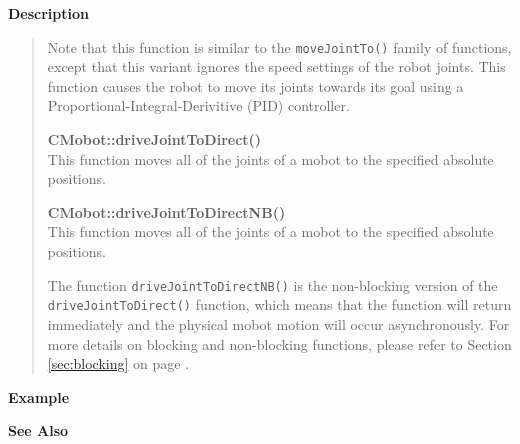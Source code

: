 {\bf Description}\\
\vspace{-12pt}
\begin{quote}
Note that this function is similar to the \texttt{moveJointTo()} family of functions, except
that this variant ignores the speed settings of the robot joints. This function causes
the robot to move its joints towards its goal using a Proportional-Integral-Derivitive (PID)
controller.

{\bf CMobot::driveJointToDirect()}\\
This function moves all of the joints of a mobot to the specified absolute positions. 

{\bf CMobot::driveJointToDirectNB()}\\
This function moves all of the joints of a mobot to the specified absolute positions. 

The function \texttt{driveJointToDirectNB()} is the non-blocking version of
the \texttt{driveJointToDirect()} function, which means that the function will return
immediately and the physical mobot motion will occur asynchronously. For
more details on blocking and non-blocking functions, please refer to 
Section \ref{sec:blocking} on page \pageref{sec:blocking}.\\
\end{quote}

\noindent
{\bf Example}\\
\noindent

\noindent
{\bf See Also}\\

